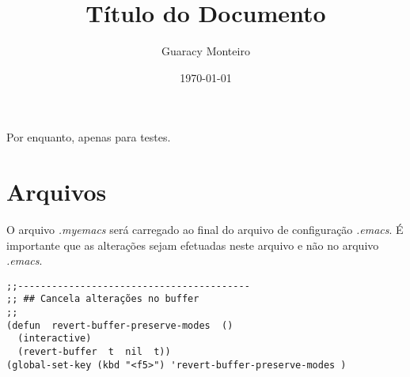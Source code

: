 \documentclass[11pt]{article}
\author{Guaracy Monteiro}
\date{\today}
\title{Título do Documento}
\begin{document}
\maketitle
\tableofcontents

Por enquanto, apenas para testes.

\section{Arquivos}
\label{sec:orgheadline1}

O arquivo \emph{.myemacs} será carregado ao final do arquivo de configuração \emph{.emacs}. É importante que as alterações sejam efetuadas neste arquivo e não no arquivo \emph{.emacs}.

\begin{verbatim}
;;-----------------------------------------
;; ## Cancela alterações no buffer
;;
(defun  revert-buffer-preserve-modes  ()
  (interactive)
  (revert-buffer  t  nil  t))
(global-set-key (kbd "<f5>") 'revert-buffer-preserve-modes )
\end{verbatim}
\end{document}
